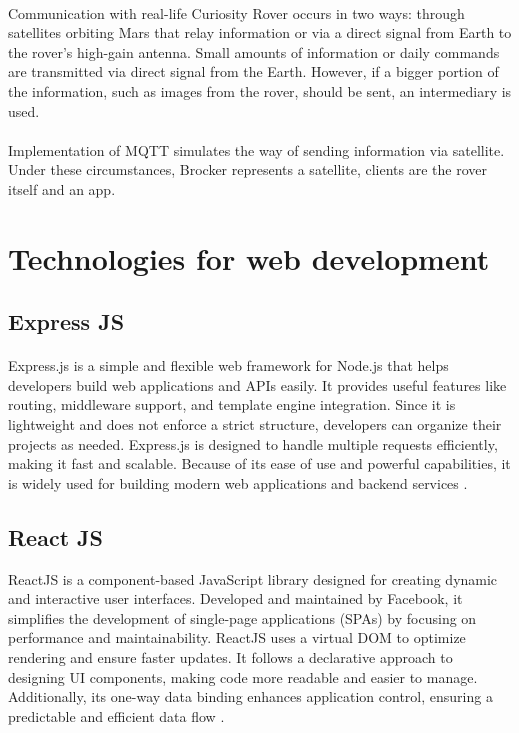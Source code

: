 \paragraph{}Communication with real-life Curiosity Rover occurs in two ways: through satellites orbiting Mars that relay information or via a direct signal from Earth to the rover's high-gain antenna. Small amounts of information or daily commands are transmitted via direct signal from the Earth. However, if a bigger portion of the information, such as images from the rover, should be sent, an intermediary is used.

\paragraph{} Implementation of MQTT simulates the way of sending information via satellite. Under these circumstances, Brocker represents a satellite, clients are the rover itself and an app.
\section{Technologies for web development}
\subsection{Express JS}
\paragraph{}Express.js is a simple and flexible web framework for Node.js that helps developers build web applications and APIs easily. It provides useful features like routing, middleware support, and template engine integration. Since it is lightweight and does not enforce a strict structure, developers can organize their projects as needed. Express.js is designed to handle multiple requests efficiently, making it fast and scalable. Because of its ease of use and powerful capabilities, it is widely used for building modern web applications and backend services \cite{expressJS:guide}.

\subsection{React JS}
ReactJS is a component-based JavaScript library designed for creating dynamic and interactive user interfaces. Developed and maintained by Facebook, it simplifies the development of single-page applications (SPAs) by focusing on performance and maintainability. ReactJS uses a virtual DOM to optimize rendering and ensure faster updates. It follows a declarative approach to designing UI components, making code more readable and easier to manage. Additionally, its one-way data binding enhances application control, ensuring a predictable and efficient data flow \cite{react:geek}.

